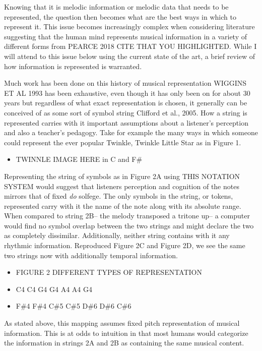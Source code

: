 \documentclass[]{book}
\providecommand{\tightlist}{%
  \setlength{\itemsep}{0pt}\setlength{\parskip}{0pt}}
\theoremstyle{definition}
\theoremstyle{definition}
\theoremstyle{definition}
\theoremstyle{remark}
\begin{document}
Knowing that it is melodic information or melodic data that needs to be
represented, the question then becomes what are the best ways in which
to represent it. This issue becomes increasingly complex when
considering literature suggesting that the human mind represents musical
information in a variety of different forms from PEARCE 2018 CITE THAT
YOU HIGHLIGHTED. While I will attend to this issue below using the
current state of the art, a brief review of how information is
represented is warranted.

Much work has been done on this history of musical representation
WIGGINS ET AL 1993 has been exhaustive, even though it has only been on
for about 30 years but regardless of what exact representation is
chosen, it generally can be conceived of as some sort of symbol string
Clifford et al., 2005. How a string is represented carries with it
important assumptions about a listener's perception and also a teacher's
pedagogy. Take for example the many ways in which someone could
represent the ever popular Twinkle, Twinkle Little Star as in Figure 1.

\begin{itemize}
\tightlist
\item
  TWINNLE IMAGE HERE in C and F\#
\end{itemize}

Representing the string of symbols as in Figure 2A using THIS NOTATION
SYSTEM would suggest that listeners perception and cognition of the
notes mirrors that of fixed \emph{do} solfege. The only symbols in the
string, or tokens, represented carry with it the name of the note along
with its absolute range. When compared to string 2B-- the melody
transposed a tritone up-- a computer would find no symbol overlap
between the two strings and might declare the two as completely
dissimilar. Additionally, neither string contains with it any rhythmic
information. Reproduced Figure 2C and Figure 2D, we see the same two
strings now with additionally temporal information.

\begin{itemize}
\tightlist
\item
  FIGURE 2 DIFFERENT TYPES OF REPRESENTATION
\item
  C4 C4 G4 G4 A4 A4 G4
\item
  F\#4 F\#4 C\#5 C\#5 D\#6 D\#6 C\#6
\end{itemize}

As stated above, this mapping assumes fixed pitch representation of
musical information. This is at odds to intuition in that most humans
would categorize the information in strings 2A and 2B as containing the
same musical content.
\end{document}
